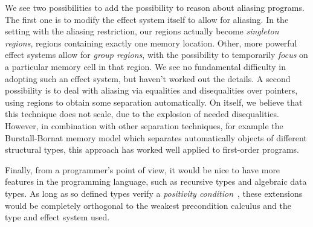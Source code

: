 \documentclass[a4paper]{llncs}
\begin{document}
We see two possibilities to add the possibility to reason about aliasing
programs. The first one is to modify the effect system itself to allow for
aliasing. In the setting with the aliasing restriction, our regions actually
become {\em singleton regions}, regions containing exactly one memory
location. Other, more powerful effect systems allow for {\em group regions},
with the possibility to temporarily {\em focus } on a particular memory cell
in that region. We see no fundamental difficulty in adopting such an effect
system, but haven't worked out the details. A second possibility is to deal
with aliasing via equalities and disequalities over pointers, using regions to
obtain some separation automatically. On itself, we believe that this
technique does not scale, due to the explosion of needed disequalities.
However, in combination with other separation techniques, for example the
Burstall-Bornat memory model which separates automatically objects of
different structural types, this approach has worked well applied to
first-order programs.

Finally, from a programmer's point of view, it would be nice to have more
features in the programming language, such as recursive types and algebraic
data types. As long as so defined types verify a {\em positivity
condition}~\cite{paulintlca93}, these extensions would be completely
orthogonal to the weakest precondition calculus and the type and effect system
used.



{}
\end{document}
